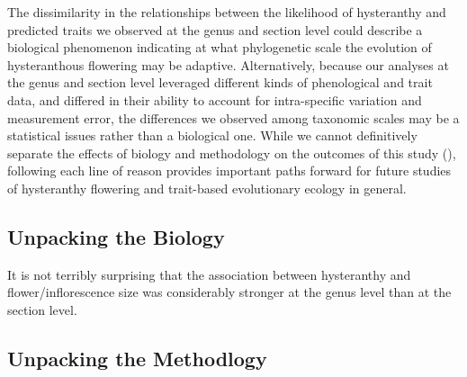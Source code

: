 \documentclass{article}\usepackage[]{graphicx}\usepackage[]{color}
\begin{document}
\noindent The dissimilarity in the relationships between the likelihood of hysteranthy and predicted traits we observed at the genus and section level could describe a biological phenomenon indicating at what phylogenetic scale the evolution of hysteranthous flowering may be adaptive. Alternatively, because our analyses at the genus and section level leveraged different kinds of phenological and trait data, and differed in their ability to account for intra-specific variation and  measurement error, the differences we observed among taxonomic scales may be a statistical issues rather than a biological one. While we cannot definitively separate the effects of biology and methodology on the outcomes of this study (), following each line of reason provides important paths forward for future studies of hysteranthy flowering and trait-based evolutionary ecology in general.







\noindent  

\subsection*{Unpacking the Biology}

It is not terribly surprising that the association between hysteranthy and flower/inflorescence size was considerably stronger at the genus level than at the section level. 

\subsection*{Unpacking the Methodlogy}
\end{document}
